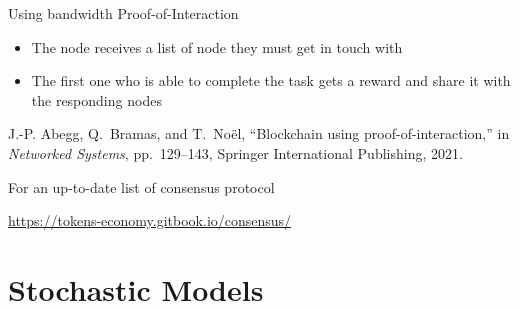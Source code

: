 \documentclass{beamer}
\begin{document}
\begin{frame}{Using bandwidth}
Proof-of-Interaction 
\begin{itemize}
  \item The node receives a list of node they must get in touch with 
  \item The first one who is able to complete the task gets a reward and share it with the responding nodes
\end{itemize}
\footnotesize{
\begin{thebibliography}{1}

J.-P. Abegg, Q.~Bramas, and T.~Noël, ``Blockchain using
  proof-of-interaction,'' in {\em Networked Systems}, pp.~129--143, Springer
  International Publishing, 2021.

\end{thebibliography}}
\medskip
For an up-to-date list of consensus protocol\\
\begin{center}
\url{https://tokens-economy.gitbook.io/consensus/}
\end{center}
\end{frame}
\section{Stochastic Models}

\begin{frame}


\end{frame}

\appendix
\end{document}
